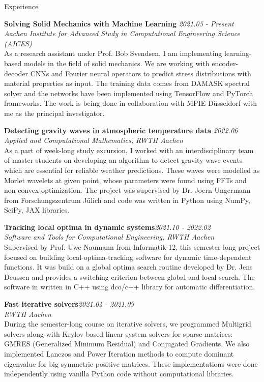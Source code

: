 \documentclass{resume} %
\begin{document}

\begin{rSection}{Experience}

{\bf Solving Solid Mechanics with Machine Learning} \hfill {\em 2021.05 - Present}\\
{\em Aachen Institute for Advanced Study in Computational Engineering Science (AICES)}\\
As a research assistant under Prof. Bob Svendsen, I am implementing learning-based models in the field of solid mechanics. We are working with encoder-decoder CNNs and Fourier neural operators to predict stress distributions with material properties as input. The training data comes from DAMASK spectral solver and the networks have been implemented using TensorFlow and PyTorch frameworks. The work is being done in collaboration with MPIE Düsseldorf with me as the principal investigator.

{\bf Detecting gravity waves in atmospheric temperature data} \hfill {\em2022.06}\\
{\em Applied and Computational Mathematics, RWTH Aachen}\\
As a part of week-long study excursion, I worked with an interdisciplinary team of master students on developing an algorithm to detect gravity wave events which are essential for reliable weather predictions. These waves were modelled as Morlet wavelets at given point, whose parameters were found using FFTs and non-convex optimization. The project was supervised by Dr. Joern Ungermann from Forschungszentrum Jülich and code was written in Python using NumPy, SciPy, JAX libraries.

{\bf Tracking local optima in dynamic systems}\hfill {\em 2021.10 - 2022.02}\\
{\em Software and Tools for Computational Engineering, RWTH Aachen}\\
Supervised by Prof. Uwe Naumann from Informatik-12, this semester-long project focused on building local-optima-tracking software for dynamic time-dependent functions. It was build on a global optima search routine developed by Dr. Jens Deussen and provides a switching criterion between global and local search.  The software in written in C++ using dco/c++ library for automatic differentiation. 

{\bf Fast iterative solvers}\hfill {\em 2021.04 - 2021.09}\\
{\em RWTH Aachen}\\
During the semester-long course on iterative solvers, we programmed Multigrid solvers along with Krylov based linear system solvers for sparse matrices: GMRES (Generalized Minimum Residual) and Conjugated Gradients. We also implemented Lanczos and Power Iteration methods to compute dominant eigenvalue for big symmetric positive matrices. These implementations were done independently using vanilla Python code without computational libraries.


\end{rSection}
\end{document}
